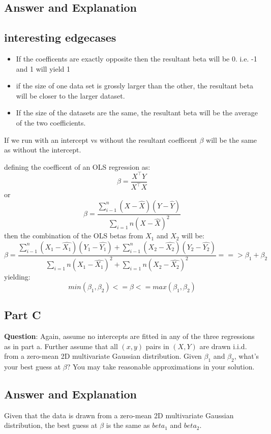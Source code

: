 \documentclass{article}
\begin{document}
\subsection*{Answer and Explanation}

\subsection*{interesting edgecases}
\begin{itemize}
    \item If the coefficents are exactly opposite then the resultant beta will be 0. i.e. -1 and 1 will yield 1 
    \item if the size of one data set is grossly larger than the other, the resultant beta will be closer to the larger dataset.
    \item If the size of the datasets are the same, the resultant beta will be the average of the two coefficients.
\end{itemize}
If we run with an intercept vs without the resultant coefficent $\beta$ will be the same as without the intercept. 

defining the coefficent of an OLS regression as: 
$$\beta = \frac{X ^\top Y}{X ^\top X}$$ or 
$$\beta = \frac{\sum_{i-1}^n{}(X-\hat{X})(Y - \hat{Y})}{\sum_{i=1}{n}(X-\hat{X})^2} $$
then the combination of the OLS betas from $X_1$ and $X_2$ will be:
$$\beta = \frac{\sum_{i-1}^n{}(X_1-\hat{X_1})(Y_1 - \hat{Y_1}) + \sum_{i-1}^n{}(X_2-\hat{X_2})(Y_2 - \hat{Y_2})
                }{\sum_{i=1}{n}(X_1-\hat{X_1})^2 + \sum_{i=1}{n}(X_2-\hat{X_2})^2
                } ==> \beta_1 + \beta_2 $$
yielding: 
$$min(\beta_1,\beta_2) <= \beta <= max(\beta_1,\beta_2)$$

\subsection*{Part C}
\textbf{Question}: Again, assume no intercepts are fitted in any of the three regressions as in part a. Further assume that all $(x, y)$ pairs in $(X, Y)$ are drawn i.i.d. from a zero-mean 2D multivariate Gaussian distribution.
                     Given $\beta_1$ and $\beta_2$, what's your best guess at $\beta$? You may take reasonable approximations in your solution.

\subsection*{Answer and Explanation}
Given that the data is drawn from a zero-mean 2D multivariate Gaussian distribution, the best guess at $\beta$ is the same as $beta_1$ and $beta_2$.
\end{document}
